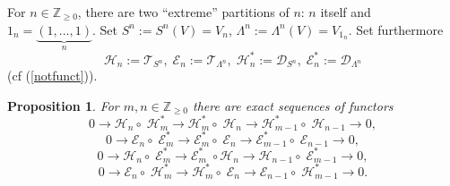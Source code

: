 \documentclass[11pt]{amsart}
\newcounter{theorem}
\newtheorem{prop}{Proposition}
\begin{document}
For $n\in\mathbb Z_{\geq 0}$, there are two ``extreme'' partitions of
$n$: $n$ itself and $1_n=\underbrace{(1,...,1)}_{n}$.
Set $S^n:=S^n(V)=V_n$, $\Lambda^n:=\Lambda^n(V)=V_{1_n}$.
Set furthermore
$$\mathcal H_n:=\mathcal T_{S^n} ,\; \mathcal E_n:=\mathcal T_{\Lambda^n},\;\mathcal H_n^*:=\mathcal D_{S^n},\; \mathcal E_n^*:=\mathcal D_{\Lambda^n}$$
(cf (\ref {notfunct})).
\begin{prop}\label{prop2} For $m,n\in\mathbb Z_{\geq 0}$ 
there are exact sequences of functors 
\begin{equation}\label{ex1}
0\rightarrow \mathcal H_{n}\circ\;\mathcal  H_m^*\rightarrow
\mathcal H^*_{m}\circ\; \mathcal H_{n}\rightarrow \mathcal
H^*_{m-1}\circ\; \mathcal H_{n-1}\rightarrow 0,
\end{equation}
\begin{equation}\label{ex2}
0\rightarrow \mathcal E_{n}\circ\;\mathcal
E^*_{m}\rightarrow \mathcal E^*_{m}\circ\; \mathcal
E_{n}\rightarrow \mathcal E^*_{m-1}\circ\; \mathcal
E_{n-1}\rightarrow 0,
\end{equation}
\begin{equation}\label{ex3}
0\rightarrow \mathcal H_{n}\circ\;\mathcal
E^*_{m}\rightarrow \mathcal E^*_{m}\;\circ \mathcal
H_{n}\rightarrow  \mathcal H_{n-1}\circ\;\mathcal
E^*_{m-1}\rightarrow 0,
\end{equation}
\begin{equation}\label{ex4}
0\rightarrow \mathcal E_{n}\circ\;\mathcal
H^*_{m}\rightarrow  \mathcal H^*_{m}\circ\;\mathcal
E_{n}\rightarrow  \mathcal E_{n-1}\circ\;\mathcal
H^*_{m-1}\rightarrow 0.
\end{equation}
\end{prop}
\end{document}
